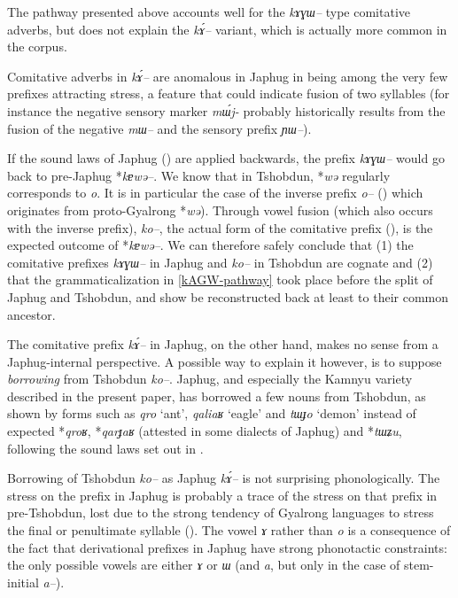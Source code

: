 \documentclass[oldfontcommands,oneside,a4paper,11pt]{article}
\newcommand{\ipa}[1]{{\phon\textit{#1}}} %
\begin{document}
The pathway presented above accounts well for the \ipa{kɤɣɯ--} type comitative adverbs, but does not explain the \ipa{kɤ́--} variant, which is actually more common in the corpus.

Comitative adverbs in \ipa{kɤ́--} are anomalous in Japhug in being among the very few prefixes attracting stress, a feature that could indicate fusion of two syllables (for instance the negative sensory marker \ipa{mɯ́j-} probably historically results from the fusion of the negative \ipa{mɯ--} and the sensory prefix \ipa{ɲɯ--}).

If the sound laws of Japhug (\citealt{jacques04these}) are applied backwards, the prefix \ipa{kɤɣɯ--} would go back to pre-Japhug *\ipa{kɐwə--}. We know that in Tshobdun, *\ipa{wə} regularly corresponds to \ipa{o}. It is in particular the case of the inverse prefix \ipa{o--} (\citealt{jackson02rentongdengdi}) which originates from proto-Gyalrong *\ipa{wə}). Through vowel fusion (which also occurs with the inverse prefix), \ipa{ko--}, the actual form of the comitative prefix (\citealt[107]{jackson98morphology}), is the expected outcome of *\ipa{kɐwə--}. We can therefore safely conclude that (1) the comitative prefixes \ipa{kɤɣɯ--} in Japhug and \ipa{ko--} in Tshobdun are cognate and (2) that the grammaticalization in \ref{kAGW-pathway} took place before the split of Japhug and Tshobdun, and show be reconstructed back at least to their common ancestor.

The comitative prefix \ipa{kɤ́--} in Japhug, on the other hand, makes no sense from a Japhug-internal perspective. A possible way to explain it however, is to suppose \textit{borrowing} from Tshobdun \ipa{ko--}. Japhug, and especially the Kamnyu variety described in the present paper, has borrowed a few nouns from Tshobdun, as shown by forms such as \ipa{qro} `ant', \ipa{qaliaʁ} `eagle' and \ipa{tɯɟo} `demon' instead of expected *\ipa{qroʁ}, *\ipa{qarɟaʁ} (attested in some dialects of Japhug) and *\ipa{tɯʑu}, following the sound laws set out in \citet{jacques04these}.

Borrowing of Tshobdun \ipa{ko--} as Japhug \ipa{kɤ́--} is not surprising phonologically. The stress on the prefix in Japhug is probably a trace of the stress on that prefix in pre-Tshobdun, lost due to the strong tendency of Gyalrong languages to stress the final or penultimate syllable (\citealt{jackson05yingao}). The vowel \ipa{ɤ} rather than \ipa{o} is a consequence of the fact that derivational prefixes in Japhug have strong phonotactic constraints: the only possible vowels are either \ipa{ɤ} or \ipa{ɯ} (and \ipa{a}, but only in the case of stem-initial \ipa{a--}).
\end{document}
